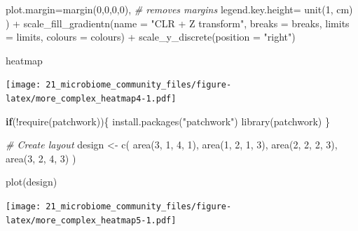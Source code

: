 \documentclass[
]{book}
\newenvironment{Shaded}{\begin{snugshade}}{\end{snugshade}}
\newcommand{\AttributeTok}[1]{\textcolor[rgb]{0.77,0.63,0.00}{#1}}
\newcommand{\CommentTok}[1]{\textcolor[rgb]{0.56,0.35,0.01}{\textit{#1}}}
\newcommand{\ControlFlowTok}[1]{\textcolor[rgb]{0.13,0.29,0.53}{\textbf{#1}}}
\newcommand{\DecValTok}[1]{\textcolor[rgb]{0.00,0.00,0.81}{#1}}
\newcommand{\FunctionTok}[1]{\textcolor[rgb]{0.00,0.00,0.00}{#1}}
\newcommand{\NormalTok}[1]{#1}
\newcommand{\OtherTok}[1]{\textcolor[rgb]{0.56,0.35,0.01}{#1}}
\newcommand{\SpecialCharTok}[1]{\textcolor[rgb]{0.00,0.00,0.00}{#1}}
\newcommand{\StringTok}[1]{\textcolor[rgb]{0.31,0.60,0.02}{#1}}
\begin{document}
\begin{Shaded}
\begin{Highlighting}[]
    \AttributeTok{plot.margin=}\FunctionTok{margin}\NormalTok{(}\DecValTok{0}\NormalTok{,}\DecValTok{0}\NormalTok{,}\DecValTok{0}\NormalTok{,}\DecValTok{0}\NormalTok{), }\CommentTok{\# removes margins}
    \AttributeTok{legend.key.height=} \FunctionTok{unit}\NormalTok{(}\DecValTok{1}\NormalTok{, }\StringTok{\textquotesingle{}cm\textquotesingle{}}\NormalTok{)}
\NormalTok{    ) }\SpecialCharTok{+}
  \FunctionTok{scale\_fill\_gradientn}\NormalTok{(}\AttributeTok{name =} \StringTok{"CLR + Z transform"}\NormalTok{, }
                       \AttributeTok{breaks =}\NormalTok{ breaks, }
                       \AttributeTok{limits =}\NormalTok{ limits, }
                       \AttributeTok{colours =}\NormalTok{ colours) }\SpecialCharTok{+} 
  \FunctionTok{scale\_y\_discrete}\NormalTok{(}\AttributeTok{position =} \StringTok{"right"}\NormalTok{)}

\NormalTok{heatmap}
\end{Highlighting}
\end{Shaded}

\texttt{[image: 21\_microbiome\_community\_files/figure-latex/more\_complex\_heatmap4-1.pdf]}

\begin{Shaded}
\begin{Highlighting}[]
\ControlFlowTok{if}\NormalTok{(}\SpecialCharTok{!}\FunctionTok{require}\NormalTok{(patchwork))\{}
    \FunctionTok{install.packages}\NormalTok{(}\StringTok{"patchwork"}\NormalTok{)}
    \FunctionTok{library}\NormalTok{(patchwork)}
\NormalTok{\}}

\CommentTok{\# Create layout}
\NormalTok{design }\OtherTok{\textless{}{-}} \FunctionTok{c}\NormalTok{(}
  \FunctionTok{area}\NormalTok{(}\DecValTok{3}\NormalTok{, }\DecValTok{1}\NormalTok{, }\DecValTok{4}\NormalTok{, }\DecValTok{1}\NormalTok{),}
  \FunctionTok{area}\NormalTok{(}\DecValTok{1}\NormalTok{, }\DecValTok{2}\NormalTok{, }\DecValTok{1}\NormalTok{, }\DecValTok{3}\NormalTok{),}
  \FunctionTok{area}\NormalTok{(}\DecValTok{2}\NormalTok{, }\DecValTok{2}\NormalTok{, }\DecValTok{2}\NormalTok{, }\DecValTok{3}\NormalTok{),}
  \FunctionTok{area}\NormalTok{(}\DecValTok{3}\NormalTok{, }\DecValTok{2}\NormalTok{, }\DecValTok{4}\NormalTok{, }\DecValTok{3}\NormalTok{)}
\NormalTok{)}

\FunctionTok{plot}\NormalTok{(design)}
\end{Highlighting}
\end{Shaded}

\texttt{[image: 21\_microbiome\_community\_files/figure-latex/more\_complex\_heatmap5-1.pdf]}
\end{document}
